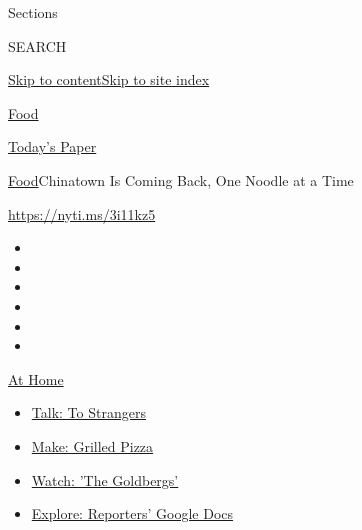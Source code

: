Sections

SEARCH

\protect\hyperlink{site-content}{Skip to
content}\protect\hyperlink{site-index}{Skip to site index}

\href{https://www.nytimes3xbfgragh.onion/section/food}{Food}

\href{https://myaccount.nytimes3xbfgragh.onion/auth/login?response_type=cookie\&client_id=vi}{}

\href{https://www.nytimes3xbfgragh.onion/section/todayspaper}{Today's
Paper}

\href{/section/food}{Food}\textbar{}Chinatown Is Coming Back, One Noodle
at a Time

\url{https://nyti.ms/3i11kz5}

\begin{itemize}
\item
\item
\item
\item
\item
\item
\end{itemize}

\href{https://www.nytimes3xbfgragh.onion/spotlight/at-home?action=click\&pgtype=Article\&state=default\&region=TOP_BANNER\&context=at_home_menu}{At
Home}

\begin{itemize}
\tightlist
\item
  \href{https://www.nytimes3xbfgragh.onion/2020/08/03/well/family/the-benefits-of-talking-to-strangers.html?action=click\&pgtype=Article\&state=default\&region=TOP_BANNER\&context=at_home_menu}{Talk:
  To Strangers}
\item
  \href{https://www.nytimes3xbfgragh.onion/2020/08/01/at-home/coronavirus-make-pizza-on-a-grill.html?action=click\&pgtype=Article\&state=default\&region=TOP_BANNER\&context=at_home_menu}{Make:
  Grilled Pizza}
\item
  \href{https://www.nytimes3xbfgragh.onion/2020/07/31/arts/television/goldbergs-abc-stream.html?action=click\&pgtype=Article\&state=default\&region=TOP_BANNER\&context=at_home_menu}{Watch:
  'The Goldbergs'}
\item
  \href{https://www.nytimes3xbfgragh.onion/interactive/2020/at-home/even-more-reporters-editors-diaries-lists-recommendations.html?action=click\&pgtype=Article\&state=default\&region=TOP_BANNER\&context=at_home_menu}{Explore:
  Reporters' Google Docs}
\end{itemize}

